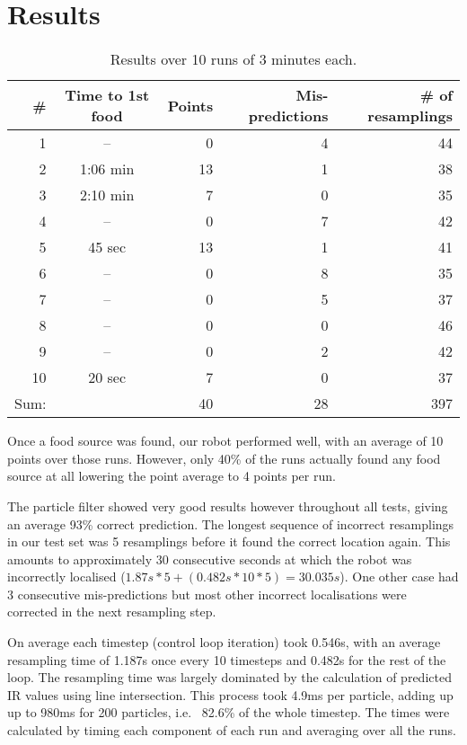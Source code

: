\documentclass[paper=a4, fontsize=12pt]{scrartcl}	%
\numberwithin{equation}{section}		%
\numberwithin{figure}{section}			%
\numberwithin{table}{section}				%
\begin{document}
\section{Results}
\begin{table}
 \begin{tabular}{| r | c | r | r | r |}
  \hline
  \# & Time to 1st food & Points & Mis-predictions & \# of resamplings \\
  \hline
  1 & -- & 0 & 4 & 44 \\ 
  2 & 1:06 min & 13 & 1 & 38 \\
  3 & 2:10 min & 7 & 0 & 35 \\
  4 & -- & 0 & 7 & 42 \\
  5 & 45 sec & 13 & 1 & 41 \\
  6 & -- & 0 & 8 & 35 \\
  7 & -- & 0 & 5 & 37 \\ 
  8 & -- & 0 & 0 & 46 \\
  9 & -- & 0 & 2 & 42 \\
  10 & 20 sec & 7 & 0 & 37 \\
  \hline \hline
  Sum: & ~ & 40 & 28 & 397 \\
  \hline
 \end{tabular}
 \label{exptable}
 \caption{Results over 10 runs of 3 minutes each.}
\end{table}


Once a food source was found, our robot performed well, with an average of 10 points over those runs. However, only 40\% of the runs actually found any food source at all lowering the point average to 4 points per run.

The particle filter showed very good results however throughout all tests, giving an average 93\% correct prediction. The longest sequence of incorrect resamplings in our test set was 5 resamplings before it found the correct location again. This amounts to approximately 30 consecutive seconds at which the robot was incorrectly localised (\(1.87s * 5 + (0.482s * 10 * 5) = 30.035s\)). One other case had 3 consecutive mis-predictions but most other incorrect localisations were corrected in the next resampling step.

On average each timestep (control loop iteration) took 0.546s, with an average resampling time of 1.187s once every 10 timesteps and 0.482s for the rest of the loop. The resampling time was largely dominated by the calculation of predicted IR values using line intersection. This process took 4.9ms per particle, adding up up to 980ms for 200 particles, i.e. ~82.6\% of the whole timestep. The times were calculated by timing each component of each run and averaging over all the runs.
\end{document}
